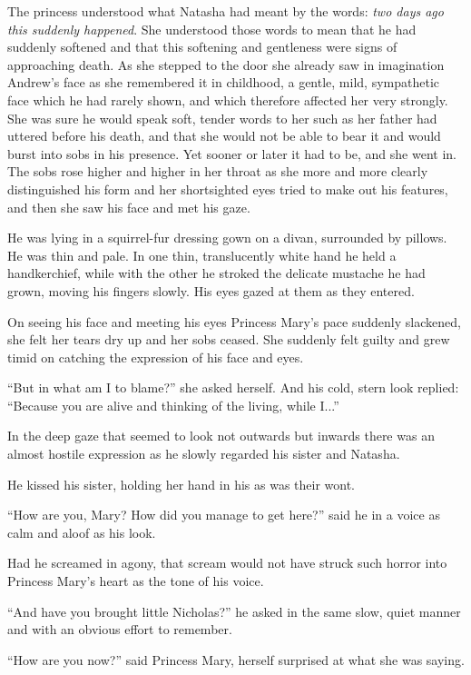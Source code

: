 The princess understood what Natasha had meant by the words:
\emph{two days ago this suddenly happened}. She understood those
words to mean that he had suddenly softened and that this
softening and gentleness were signs of approaching death. As she
stepped to the door she already saw in imagination Andrew's face
as she remembered it in childhood, a gentle, mild, sympathetic
face which he had rarely shown, and which therefore affected her
very strongly. She was sure he would speak soft, tender words to
her such as her father had uttered before his death, and that she
would not be able to bear it and would burst into sobs in his
presence. Yet sooner or later it had to be, and she went in. The
sobs rose higher and higher in her throat as she more and more
clearly distinguished his form and her shortsighted eyes tried to
make out his features, and then she saw his face and met his
gaze.

He was lying in a squirrel-fur dressing gown on a divan,
surrounded by pillows. He was thin and pale. In one thin,
translucently white hand he held a handkerchief, while with the
other he stroked the delicate mustache he had grown, moving his
fingers slowly. His eyes gazed at them as they entered.

On seeing his face and meeting his eyes Princess Mary's pace
suddenly slackened, she felt her tears dry up and her sobs
ceased. She suddenly felt guilty and grew timid on catching the
expression of his face and eyes.

``But in what am I to blame?'' she asked herself. And his cold,
stern look replied: ``Because you are alive and thinking of the
living, while I...''

In the deep gaze that seemed to look not outwards but inwards
there was an almost hostile expression as he slowly regarded his
sister and Natasha.

He kissed his sister, holding her hand in his as was their wont.

``How are you, Mary? How did you manage to get here?'' said he in
a voice as calm and aloof as his look.

Had he screamed in agony, that scream would not have struck such
horror into Princess Mary's heart as the tone of his voice.

``And have you brought little Nicholas?'' he asked in the same
slow, quiet manner and with an obvious effort to remember.

``How are you now?'' said Princess Mary, herself surprised at
what she was saying.

